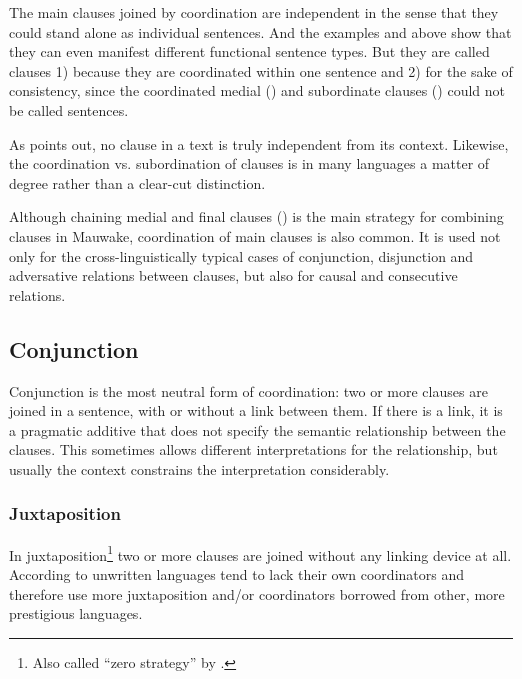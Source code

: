 The main clauses joined by coordination are independent in the sense that they could stand alone as individual sentences. And the examples  and  above show that they can even manifest different functional sentence types. But they are called clauses 1) because they are coordinated within one sentence and 2) for the sake of consistency, since the coordinated medial () and subordinate clauses () could not be called sentences.

As \citet[848]{Givon1990} points out, no clause in a text is truly independent from its context. Likewise, the coordination vs. subordination of clauses is in many languages a matter of degree rather than a clear-cut distinction. 

Although chaining medial and final clauses () is the main strategy for combining clauses in Mauwake, coordination of main clauses is also common. It is used not only for the cross-linguistically typical cases of conjunction, disjunction and adversative relations between clauses, but also for causal and consecutive relations.  

\subsection{Conjunction} \label{sec:8.1.1}

Conjunction is the most neutral form of coordination: two or more clauses are joined in a sentence, with or without a link between them. If there is a link, it is a pragmatic additive that does not specify the semantic relationship between the clauses. This sometimes allows different interpretations for the relationship, but usually the context constrains the interpretation considerably. 

\subsubsection{Juxtaposition}

In juxtaposition\footnote{Also called ``zero strategy'' by \citet[25]{Payne1985}.} two or more clauses are joined without any linking device at all. According to \citet[8]{Haspelmath2007} unwritten languages tend to lack their own coordinators and therefore use more juxtaposition and/or coordinators borrowed  from other, more prestigious languages. 

